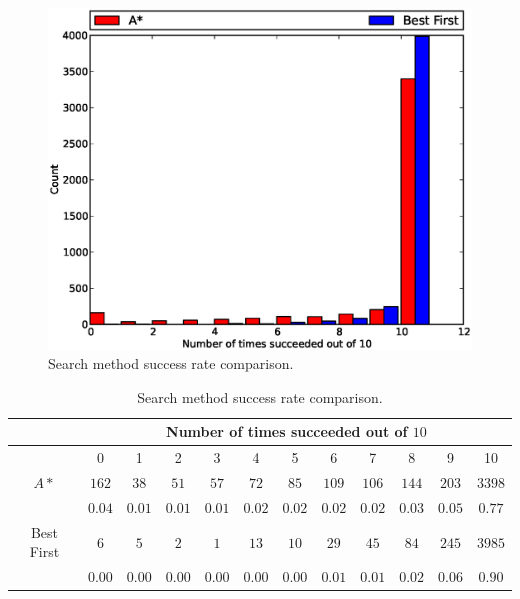 \begin{figure}[H]
\begin{center}
\includegraphics[width=\textwidth]{Images/search_success_comparison.eps}
\caption[Search method success rate comparison]{Search method success rate
comparison.}
\label{fig:search_success}
\end{center}
\end{figure}

\begin{table}[H]
\begin{center}
\begin{singlespace}
\begin{tabular}{|c||c|c|c|c|c|c|c|c|c|c|c|}
\hline
 & \multicolumn{11}{|c|}{Number of times succeeded out of $10$} \\
\hline
 & 0 & 1 & 2 & 3 & 4 & 5 & 6 & 7 & 8 & 9 & 10 \\
\hline\hline
$A*$ & $162$ & $38$ & $51$ & $57$ & $72$ & $85$ & $109$ & $106$ & $144$ & $203$ & $3398$ \\
 & $0.04$ & $0.01$ & $0.01$ & $0.01$ & $0.02$ & $0.02$ & $0.02$ & $0.02$ & $0.03$ & $0.05$ & $0.77$ \\
\hline
 Best First & $6$ & $5$ & $2$ & $1$ & $13$ & $10$ & $29$ & $45$ & $84$ & $245$ & $3985$ \\
  & $0.00$ & $0.00$ & $0.00$ & $0.00$ & $0.00$ & $0.00$ & $0.01$ & $0.01$ & $0.02$ & $0.06$ & $0.90$ \\
\hline
\end{tabular}
\end{singlespace}
\end{center}
\caption[Search method success rate comparison]{Search method success rate
comparison.}
\label{tb:search_success}
\end{table}


